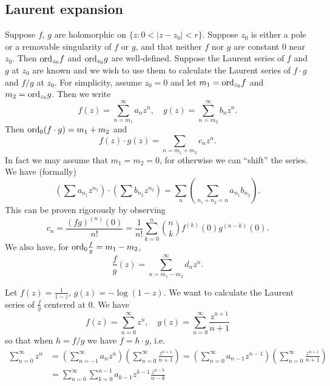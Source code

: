 \subsection{Laurent expansion}
Suppose $f$, $g$ are holomorphic on $\{ z : 0 < |z - z_0| < r \}$.
Suppose $z_0$ is either a pole or a removable singularity of $f$ or
$g$, and that neither $f$ nor $g$ are constant 0 near $z_0$. Then
$\mathrm{ord}_{z_0} f$ and $\mathrm{ord}_{z_0} g$ are well-defined. Suppose the
Laurent series of $f$ and $g$ at $z_0$ are known and we wish to use
them to calculate the Laurent series of $f \cdot g$ and $f / g$
at $z_0$. For simplicity, assume $z_0 = 0$ and let
$m_1 = \mathrm{ord}_{z_0} f$ and $m_2 = \mathrm{ord}_{z_0} g$. Then we write
$$
f(z) = \sum_{n=m_1}^\infty a_n z^n, \quad
g(z) = \sum_{n=m_2}^\infty b_n z^n.
$$
Then $\mathrm{ord}_0 (f \cdot g) = m_1 + m_2$ and
$$
  f(z) \cdot g(z)
= \sum_{n = m_1 + m_2} c_n z^n.
$$
In fact we may assume that $m_1 = m_2 = 0$, for otherwise we can
``shift'' the series. We have (formally)
$$
      \left( \sum a_{n_1} z^{n_1} \right)
\cdot \left( \sum b_{n_2} z^{n_2} \right)
=     \sum_n
        \left(
          \sum_{n_1 + n_2 = n} a_{n_1} b_{n_2}
        \right).
$$
This can be proven rigorously by observing
$$
  c_n
= \frac{(f g)^{(n)}(0)}{n!}
= \frac{1}{n!}
  \sum_{k=0}^n
    {n \choose k}
    f^{(k)}(0)
    g^{(n-k)}(0).
$$
We also have, for
$\mathrm{ord}_0 \frac{f}{g} = m_1 - m_2$,
$$
  \frac{f}{g}(z)
= \sum_{n=m_1-m_2}^\infty d_n z^n.
$$

\begin{xmpl}
Let $f(z) = \frac{1}{1 - z}$, $g(z) = -\log (1 - z)$.
We want to calculate the Laurent series of $\frac{f}{g}$
centered at 0. We have
$$
f(z) = \sum_{n=0}^\infty z^n, \quad
g(z) = \sum_{n=0}^\infty \frac{z^{n+1}}{n + 1}
$$
so that when $h = f / g$ we have $f = h \cdot g$, i.e.
\begin{align*}
   \sum_{n=0}^\infty z^n
&= \left(
     \sum_{n=-1}^\infty
       a_n z^n
   \right)
   \left(
     \sum_{n=0}^\infty
       \frac{z^{n+1}}{n+1}
   \right)
 = \left(
     \sum_{n=0}^\infty
       a_{n-1} z^{n-1}
   \right)
   \left(
     \sum_{n=0}^\infty
       \frac{z^{n+1}}{n+1}
   \right) \\
&= \sum_{n=0}^\infty
     \sum_{k=0}^{n-1}
       a_{k-1} z^{k-1}
       \frac{z^{n-k}}{n - k}
\end{align*}
\end{xmpl}
